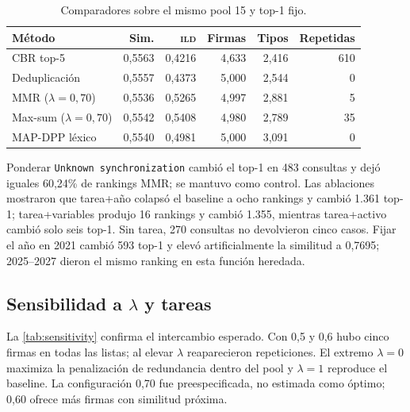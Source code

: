 \documentclass[11pt,a4paper]{article}
\newcommand{\ILD}{\textsc{ild}}
\begin{document}
\begin{table}[H]
\centering
\caption{Comparadores sobre el mismo pool 15 y top-1 fijo.}
\label{tab:baselines}
\footnotesize
\begin{tabular}{lrrrrr}
\toprule
Método & Sim. & \ILD{} & Firmas & Tipos & Repetidas \\
\midrule
CBR top-5 & 0,5563 & 0,4216 & 4,633 & 2,416 & 610 \\
Deduplicación & 0,5557 & 0,4373 & 5,000 & 2,544 & 0 \\
MMR ($\lambda=0{,}70$) & 0,5536 & 0,5265 & 4,997 & 2,881 & 5 \\
Max-sum ($\lambda=0{,}70$) & 0,5542 & 0,5408 & 4,980 & 2,789 & 35 \\
MAP-DPP léxico & 0,5540 & 0,4981 & 5,000 & 3,091 & 0 \\
\bottomrule
\end{tabular}
\end{table}

Ponderar \texttt{Unknown synchronization} cambió el top-1 en 483 consultas y dejó iguales 60,24\% de rankings MMR; se mantuvo como control. Las ablaciones mostraron que tarea+año colapsó el baseline a ocho rankings y cambió 1.361 top-1; tarea+variables produjo 16 rankings y cambió 1.355, mientras tarea+activo cambió solo seis top-1. Sin tarea, 270 consultas no devolvieron cinco casos. Fijar el año en 2021 cambió 593 top-1 y elevó artificialmente la similitud a 0,7695; 2025--2027 dieron el mismo ranking en esta función heredada.

\subsection{Sensibilidad a \texorpdfstring{$\lambda$}{lambda} y tareas}

La \cref{tab:sensitivity} confirma el intercambio esperado. Con 0,5 y 0,6 hubo cinco firmas en todas las listas; al elevar $\lambda$ reaparecieron repeticiones. El extremo $\lambda=0$ maximiza la penalización de redundancia dentro del pool y $\lambda=1$ reproduce el baseline. La configuración 0,70 fue preespecificada, no estimada como óptimo; 0,60 ofrece más firmas con similitud próxima.
\end{document}

